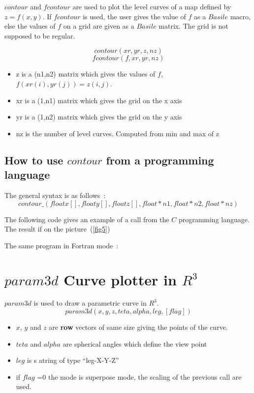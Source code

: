 $contour$ and $fcontour$ are used to plot the level curves of a map defined 
by $z=f(x,y)$. If $fcontour$ is used, the user gives the value of $f$ as a $Basile$ macro, else the values of $f$ on a grid are given as a $Basile$ matrix.
 The grid is not supposed to be regular. 

\[
contour(xr,yr,z,nz)
\]
\[
fcontour(f,xr,yr,nz)
\]
\begin{itemize}
 \item z  is a (n1,n2) matrix which gives the values of $f$, $f(xr(i),yr(j))=z(i,j)$.
 \item xr is a (1,n1) matrix which gives the grid on the x axis 
 \item yr is a (1,n2) matrix  which gives the grid on the y axis 
 \item nz is the number of level curves. Computed from min and max of z
\end{itemize}

\subsection{How to use $contour$ from a programming language}
The general syntax is as  follows~:
\[
contour\_(float x[],float y[],float z[],float *n1,float *n2,float *nz)
\]

The following code 
 gives an example of a call from the $C$ programming language. The result 
 if on the picture~(\ref{fig5})


 

The same program in Fortran mode~:

 


\section{ $param3d$ Curve plotter in $R^3$}
$param3d$ is used to draw a parametric curve in $R^3$.
\[
	param3d(x,y,z,teta,alpha,leg,[flag])
\]
\begin{itemize}
\item $x$, $y$ and $z$ are {\bf row} vectors of same size giving the points 
 of the curve.
\item $teta$ and $alpha$ are  spherical angles which  define the view point
\item $leg$ is s atring of type ``leg-X\@leg-Y\@leg-Z''
\item if $flag$ =0 the mode is superpose mode, the scaling of the previous 
 call are used. 
\end{itemize}
